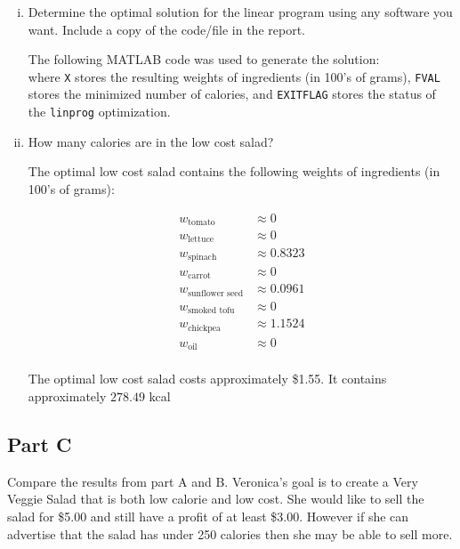 \documentclass[../main.tex]{subfiles}
\begin{document}
\begin{enumerate}[i.]
	\item Determine the optimal solution for the linear program using any software you want. Include a copy of the code/file in the report.

	The following MATLAB code was used to generate the solution: \\

	

	where \verb|X| stores the resulting weights of ingredients (in 100's of grams), \verb|FVAL| stores the minimized number of calories, and \verb|EXITFLAG| stores the status of the \verb|linprog| optimization.

	\item How many calories are in the low cost salad?

	The optimal low cost salad contains the following weights of ingredients (in 100's of grams):

	\begin{equation*}
		\begin{aligned}
			w_{\text{tomato}} &\approx 0 \\
			w_{\text{lettuce}} &\approx 0 \\
			w_{\text{spinach}} &\approx 0.8323 \\
			w_{\text{carrot}} &\approx 0 \\
			w_{\text{sunflower seed}} &\approx 0.0961 \\
			w_{\text{smoked tofu}} &\approx 0 \\
			w_{\text{chickpea}} &\approx 1.1524 \\
			w_{\text{oil}} &\approx 0 \\
		\end{aligned}
	\end{equation*}

	The optimal low cost salad costs approximately \$1.55. It contains approximately $278.49$ kcal


\end{enumerate}

\subsection*{Part C}
Compare the results from part A and B. Veronica’s goal is to create a Very Veggie Salad that is both low calorie and low cost. She would like to sell the salad for \$5.00 and still have a profit of at least \$3.00. However if she can advertise that the salad has under 250 calories then she may be able to sell more.
\end{document}

